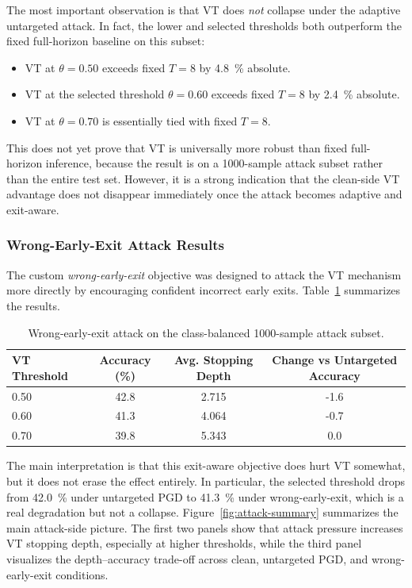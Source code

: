 \documentclass[11pt]{article}
\begin{document}
The most important observation is that VT does \emph{not} collapse under the adaptive untargeted attack. In fact, the lower and selected thresholds both outperform the fixed full-horizon baseline on this subset:
\begin{itemize}[leftmargin=1.5em]
    \item VT at \(\theta=0.50\) exceeds fixed $T=8$ by \SI{4.8}{\percent} absolute.
    \item VT at the selected threshold \(\theta=0.60\) exceeds fixed $T=8$ by \SI{2.4}{\percent} absolute.
    \item VT at \(\theta=0.70\) is essentially tied with fixed $T=8$.
\end{itemize}

This does not yet prove that VT is universally more robust than fixed full-horizon inference, because the result is on a 1000-sample attack subset rather than the entire test set. However, it is a strong indication that the clean-side VT advantage does not disappear immediately once the attack becomes adaptive and exit-aware.

\subsubsection{Wrong-Early-Exit Attack Results}
The custom \emph{wrong-early-exit} objective was designed to attack the VT mechanism more directly by encouraging confident incorrect early exits. Table~\ref{tab:attack-wrong-exit} summarizes the results.

\begin{table}[h]
\centering
\caption{Wrong-early-exit attack on the class-balanced 1000-sample attack subset.}
\label{tab:attack-wrong-exit}
\begin{tabular}{lccc}
\toprule
VT Threshold & Accuracy (\%) & Avg. Stopping Depth & Change vs Untargeted Accuracy \\
\midrule
0.50 & 42.8 & 2.715 & -1.6 \\
0.60 & 41.3 & 4.064 & -0.7 \\
0.70 & 39.8 & 5.343 & 0.0 \\
\bottomrule
\end{tabular}
\end{table}

The main interpretation is that this exit-aware objective does hurt VT somewhat, but it does not erase the effect entirely. In particular, the selected threshold drops from \SI{42.0}{\percent} under untargeted PGD to \SI{41.3}{\percent} under wrong-early-exit, which is a real degradation but not a collapse.
Figure~\ref{fig:attack-summary} summarizes the main attack-side picture. The first two panels show that attack pressure increases VT stopping depth, especially at higher thresholds, while the third panel visualizes the depth--accuracy trade-off across clean, untargeted PGD, and wrong-early-exit conditions.
\end{document}
